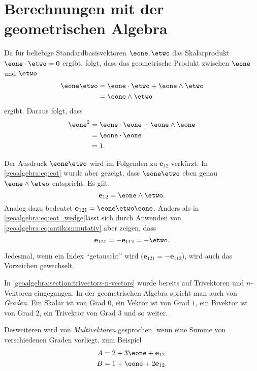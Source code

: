 \newcommand{\eot}{\mathbf{e}_{12}}
\section{Berechnungen mit der geometrischen Algebra}
Da für beliebige Standardbasisvektoren $\eone, \etwo$ das Skalarprodukt $\eone \cdot \etwo = 0$ ergibt,
folgt, dass das geometrische Produkt zwischen $\eone$ und $\etwo$
\begin{equation}
  \begin{aligned}
  \eone \etwo &= \eone \cdot \etwo + \eone \wedge \etwo \\
  &= \eone \wedge \etwo
  \end{aligned}
  \label{geoalgebra:eq:eot}
\end{equation}
ergibt.
Daraus folgt, dass
\begin{equation}
  \begin{aligned}
  \eone^2 &= \eone \cdot \eone + \eone \wedge \eone \\
  &= \eone \cdot \eone \\
  &= 1.
  \end{aligned}
\end{equation}

Der Ausdruck $\eone \etwo$ wird im Folgenden zu $\eot$ verkürzt.
In \eqref{geoalgebra:eq:eot} wurde aber gezeigt, dass $\eone \etwo$ eben
genau $\eone \wedge \etwo$ entspricht. Es gilt
\begin{equation}
  \eot = \eone \wedge \etwo.
  \label{geoalgebra:eq:eot_wedge}
\end{equation}
Analog dazu bedeutet $\mathbf{e}_{121} = \eone \etwo \eone$.
Anders als in \eqref{geoalgebra:eq:eot_wedge}lässt sich durch Anwenden von \eqref{geoalgebra:eq:antikommutativ}
aber zeigen, dass
\begin{equation}
  \mathbf{e}_{121} = - \mathbf{e}_{112} = -\etwo. 
\end{equation}

Jedesmal, wenn ein Index ``getauscht'' wird ($\mathbf{e}_{121} = -\mathbf{e}_{112}$), wird auch das Vorzeichen
gewechselt.

In \autoref{geoalgebra:section:trivectors-n-vectors} wurde bereits auf Trivektoren und $n$-Vektoren eingegangen. 
In der geometrischen Algebra
spricht man auch von \emph{Graden}. Ein Skalar ist von
Grad $0$, ein Vektor ist von Grad $1$, ein Bivektor ist von Grad $2$, ein Trivektor von Grad $3$ und so weiter.

Desweiteren wird von \emph{Multivektoren} gesprochen, wenn eine Summe von verschiedenen Graden vorliegt, zum Beispiel
\begin{align}
A &= 2 + 3 \eone + \eot \\
B &= 1 + \eone + 2 \eot.
\end{align}


